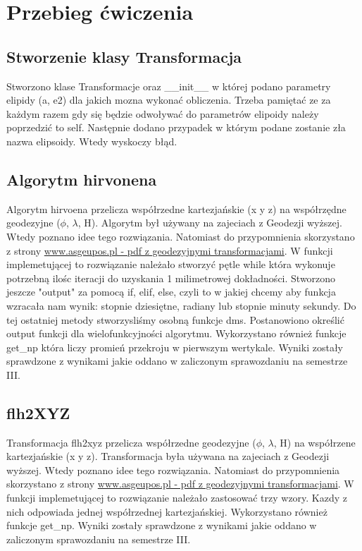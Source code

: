 \section{Przebieg ćwiczenia}

\subsection{Stworzenie klasy Transformacja}
Stworzono klase Transformacje oraz \_{}\_{}init\_{}\_{} w której podano parametry elipidy (a, e2) dla jakich mozna wykonać obliczenia. Trzeba pamiętać ze za każdym razem gdy się będzie odwoływać do parametrów elipoidy należy poprzedzić to self. Następnie dodano przypadek w którym podane zostanie zła nazwa elipsoidy. Wtedy wyskoczy błąd.

\subsection{Algorytm hirvonena} 
Algorytm hirvoena przelicza współrzedne kartezjańskie (x y z) na współrzędne geodezyjne ($\phi$, $\lambda$, H). Algorytm był używany na zajeciach z Geodezji wyższej. Wtedy poznano idee tego rozwiązania. Natomiast do przypomnienia skorzystano z strony \href{http://www.asgeupos.pl/index.php?wpg_type=tech_transf&sub=xyz_blh}{www.asgeupos.pl - pdf z geodezyjnymi transformacjami}.\citep{Pdf.geodezyjny.dla.Polski} W funkcji implemetującej to rozwiązanie należało stworzyć pętle while która wykonuje potrzebną ilośc iteracji do uzyskania 1 milimetrowej dokładności. Stworzono jeszcze "output" za pomocą if, elif, else, czyli to w jakiej chcemy aby funkcja wzracała nam wynik: stopnie dziesiętne, radiany lub stopnie minuty sekundy. Do tej ostatniej metody stworzysliśmy osobną funkcje dms. Postanowiono określić output funkcji dla wielofunkcyjności algorytmu. Wykorzystano również funkcje get\_{}np która liczy promień przekroju w pierwszym wertykale. Wyniki zostały sprawdzone z wynikami jakie oddano w zaliczonym sprawozdaniu na semestrze III.

\subsection{flh2XYZ} 
Transformacja flh2xyz przelicza współrzedne geodezyjne ($\phi$, $\lambda$, H) na współrzene kartezjańskie (x y z). Transformacja była używana na zajeciach z Geodezji wyższej. Wtedy poznano idee tego rozwiązania. Natomiast do przypomnienia skorzystano z strony \href{http://www.asgeupos.pl/index.php?wpg_type=tech_transf&sub=xyz_blh}{www.asgeupos.pl - pdf z geodezyjnymi transformacjami}. W funkcji implemetującej to rozwiązanie należało zastosować trzy wzory. Kazdy z nich odpowiada jednej współrzednej kartezjańskiej. Wykorzystano również funkcje get\_{}np. Wyniki zostały sprawdzone z wynikami jakie oddano w zaliczonym sprawozdaniu na semestrze III.

